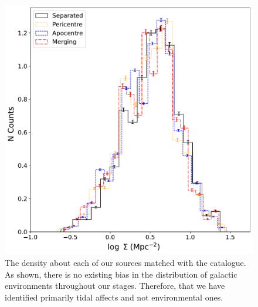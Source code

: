 \begin{figure}
\centering
\includegraphics[width=\textwidth]{Chapter3/figures/density-stage.pdf}
\caption[The density about each of our sources matched with the \citet{2017ApJ...837...16D} catalogue.]{The density about each of our sources matched with the \citet{2017ApJ...837...16D} catalogue. As shown, there is no existing bias in the distribution of galactic environments throughout our stages. Therefore, that we have identified primarily tidal affects and not environmental ones.}
\label{fig:dens-stage}
\end{figure}

